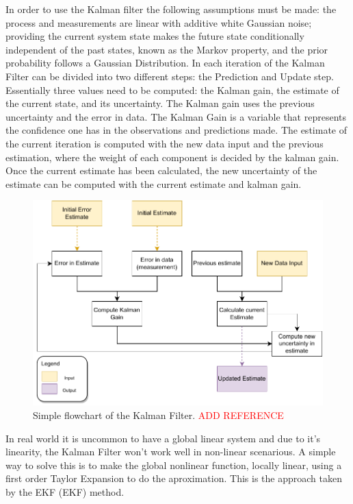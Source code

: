 In order to use the Kalman filter the following assumptions must be made: the process and measurements are linear with additive white Gaussian noise; providing the current system state makes the future state conditionally independent of the past states, known as the Markov property, and the prior probability follows a Gaussian Distribution. In each iteration of the Kalman Filter can be divided into two different steps: the Prediction and Update step. Essentially three values need to be computed: the Kalman gain, the estimate of the current state, and its uncertainty.
The Kalman gain uses the previous uncertainty and the error in data. The Kalman Gain is a variable that represents the confidence one has in the observations and predictions made. The estimate of the current iteration is computed with the new data input and the previous estimation, where the weight of each component is decided by the kalman gain. Once the current estimate has been calculated, the new uncertainty of the estimate can be computed with the current estimate and kalman gain.


\begin{figure}[H]
    \centering
    \includegraphics[width=0.7\linewidth]{images/background/Kalman-diagram.pdf}
    \caption{Simple flowchart of the Kalman Filter. \textcolor{red}{ADD REFERENCE}}
    \label{fig: flowchart kalman}
\end{figure}


In real world it is uncommon to have a global linear system and due to it's linearity, the Kalman Filter won't work well in non-linear scenarious. A simple way to solve this is to make the global nonlinear function, locally linear, using a first order Taylor Expansion to do the aproximation. This is the approach taken by the \acl{EKF} (\acs*{EKF}) method.

